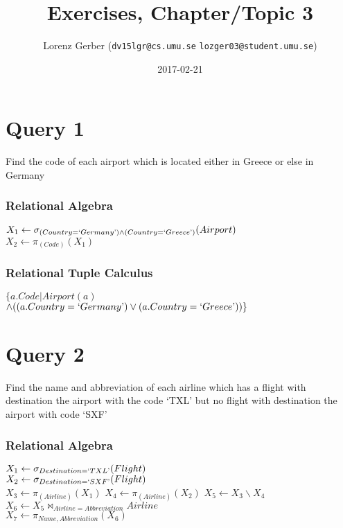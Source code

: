 \documentclass[a4paper,11pt,twoside]{article}
\title{Exercises, Chapter/Topic 3}
\author{Lorenz Gerber ({\tt{dv15lgr@cs.umu.se}} {\tt{lozger03@student.umu.se}})}
\date{2017-02-21}
\begin{document}
\lstset{language=C}
\maketitle
\thispagestyle{empty}
\thispagestyle{empty}
\newpage

\clearpage
{}

\section*{Query 1}
Find the code of each airport which is located either in Greece or else in Germany
\subsubsection*{Relational Algebra}
$X_1 \leftarrow \sigma_{(Country = `Germany\textrm') \land (Country = `Greece\textrm')}(Airport)$\\
$X_2 \leftarrow \pi_{(Code)}(X_1)$\\

\subsubsection*{Relational Tuple Calculus}
$\{a.Code|Airport(a)$\\
$\land((a.Country = `Germany\textrm') \lor (a.Country = `Greece\textrm'))\}$

\section*{Query 2}
Find the name and abbreviation of each airline which has a flight with destination the airport with the code `TXL' but no flight with destination the airport with code `SXF'
\subsubsection*{Relational Algebra}
$X_1 \leftarrow \sigma_{Destination=`TXL\textrm'}(Flight)$\\
$X_2 \leftarrow \sigma_{Destination=`SXF\textrm'}(Flight)$\\
$X_3 \leftarrow \pi_{(Airline)}(X_1)$
$X_4 \leftarrow \pi_{(Airline)}(X_2)$
$X_5 \leftarrow X_3 \backslash X_4$\\
$X_6 \leftarrow X_5 \Join_{Airline=Abbreviation} Airline$\\
$X_7 \leftarrow \pi_{Name, Abbreviation}(X_6)$\\
\end{document}
